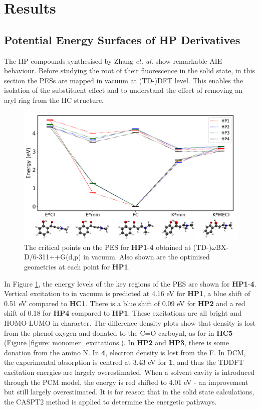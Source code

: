 \section{Results}\label{section: Connecting_Results}
\subsection{Potential Energy Surfaces of \textbf{HP} Derivatives} \label{section: Connecting_Vacuum}
The \acf{HP} compounds synthesised by Zhang \textit{et. al.} show remarkable \ac{AIE} behaviour.  Before studying the root of their fluorescence in the solid state, in this section the \acp{PES} are mapped in vacuum at (TD-)DFT level. This enables the isolation of the substituent effect and to understand the effect of removing an aryl ring from the \ac{HC} structure. 
\begin{figure}[H]
\centering
  \includegraphics[width=0.8\linewidth]{5ConnectingCrystalStructure/2HP_energies_vac.pdf}
  \caption[The vacuum PES of HP\textbf{1}-\textbf{4} with TDDFT]{The critical points on the \ac{PES} for \textbf{HP}\textbf{1}-\textbf{4} obtained at (TD-)$\omega$BX-D/6-311++G(d,p) in vacuum. Also shown are the optimised geometries at each point for \textbf{HP1}.}
  \label{figure: HP_energies_vac}
\end{figure}
In Figure \ref{figure: HP_energies_vac}, the energy levels of the key regions of the \ac{PES} are shown for \textbf{HP1}-\textbf{4}. Vertical excitation to \sone{} in vacuum is predicted at 4.16 eV for \textbf{HP1}, a blue shift of 0.51 eV compared to \textbf{HC1}.  There is a blue shift of 0.09 eV for \textbf{HP2} and a red shift of 0.18 for \textbf{HP4} compared to \textbf{HP1}. These excitations are all  bright and HOMO-LUMO in character. The difference density plots show that density is lost from the phenol oxygen and donated to the C=O carboynl, as for \sone{} in \textbf{HC5} (Figure \ref{figure: monomer_excitations}). In \textbf{HP2} and \textbf{HP3}, there is some donation from the amino N. In \textbf{4}, electron density is lost from the F. In DCM, the experimental absorption is centred at 3.43 eV for \textbf{1}, and thus the TDDFT excitation energies are largely overestimated. When a solvent cavity is introduced through the \ac{PCM} model, the \sone{} energy is red shifted to 4.01 eV - an improvement but still largely overestimated. It is for reason that in the solid state calculations, the CASPT2 method is applied to determine the energetic pathways.

